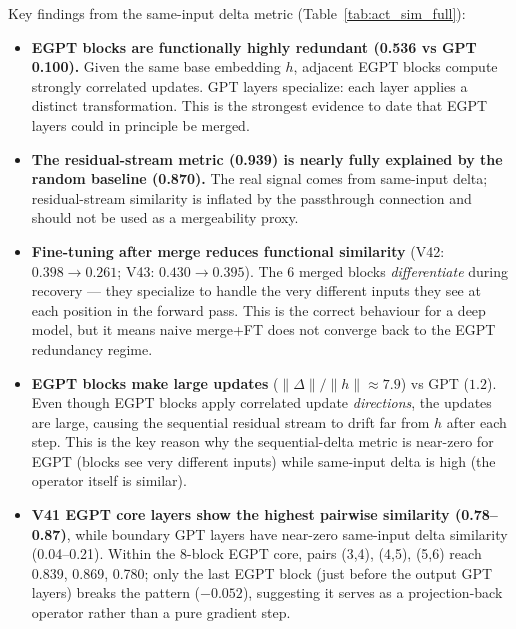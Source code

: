 Key findings from the same-input delta metric (Table~\ref{tab:act_sim_full}):
\begin{itemize}
  \item \textbf{EGPT blocks are functionally highly redundant (0.536 vs GPT 0.100).}
        Given the same base embedding $h$, adjacent EGPT blocks compute strongly correlated
        updates.  GPT layers specialize: each layer applies a distinct transformation.
        This is the strongest evidence to date that EGPT layers could in principle be merged.

  \item \textbf{The residual-stream metric (0.939) is nearly fully explained by the random baseline
        (0.870).} The real signal comes from same-input delta; residual-stream similarity
        is inflated by the passthrough connection and should not be used as a mergeability proxy.

  \item \textbf{Fine-tuning after merge reduces functional similarity} (V42: $0.398 \to 0.261$;
        V43: $0.430 \to 0.395$). The 6 merged blocks \emph{differentiate} during recovery ---
        they specialize to handle the very different inputs they see at each position in the
        forward pass.  This is the correct behaviour for a deep model, but it means naive
        merge+FT does not converge back to the EGPT redundancy regime.

  \item \textbf{EGPT blocks make large updates} ($\|\Delta\|/\|h\| \approx 7.9$) vs GPT ($1.2$).
        Even though EGPT blocks apply correlated update \emph{directions}, the updates are
        large, causing the sequential residual stream to drift far from $h$ after each step.
        This is the key reason why the sequential-delta metric is near-zero for EGPT (blocks
        see very different inputs) while same-input delta is high (the operator itself is similar).

  \item \textbf{V41 EGPT core layers show the highest pairwise similarity (0.78--0.87)},
        while boundary GPT layers have near-zero same-input delta similarity (0.04--0.21).
        Within the 8-block EGPT core, pairs (3,4), (4,5), (5,6) reach 0.839, 0.869, 0.780;
        only the last EGPT block (just before the output GPT layers) breaks the pattern ($-0.052$),
        suggesting it serves as a projection-back operator rather than a pure gradient step.


\end{itemize}
